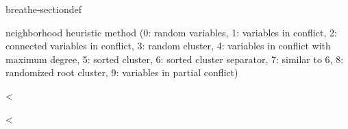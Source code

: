 \documentclass[letterpaper,10pt,openany,oneside,english]{sphinxmanual}
\begin{document}
\begin{fulllineitems}
\begin{sphinxuseclass}{breathe-sectiondef}
\begin{fulllineitems}
\sphinxAtStartPar
neighborhood heuristic method (0: random variables, 1: variables in conflict, 2: connected variables in conflict, 3: random cluster, 4: variables in conflict with maximum degree, 5: sorted cluster, 6: sorted cluster separator, 7: similar to 6, 8: randomized root cluster, 9: variables in partial conflict) 

\end{fulllineitems}


\begin{fulllineitems}
\label{\detokenize{ref/ref_cpp:_CPPv4N8ToulBar219vnsNeighborSizeSyncE}}\label{\detokenize{ref/ref_cpp:_CPPv3N8ToulBar219vnsNeighborSizeSyncE}}\label{\detokenize{ref/ref_cpp:_CPPv2N8ToulBar219vnsNeighborSizeSyncE}}\label{\detokenize{ref/ref_cpp:ToulBar2::vnsNeighborSizeSync__b}}
\pysigstartsignatures
\pysigstartmultiline
{}
\pysigstopmultiline
\pysigstopsignatures
\sphinxAtStartPar
\textless{} 

\end{fulllineitems}


\begin{fulllineitems}
\label{\detokenize{ref/ref_cpp:_CPPv4N8ToulBar216vnsParallelLimitE}}\label{\detokenize{ref/ref_cpp:_CPPv3N8ToulBar216vnsParallelLimitE}}\label{\detokenize{ref/ref_cpp:_CPPv2N8ToulBar216vnsParallelLimitE}}\label{\detokenize{ref/ref_cpp:ToulBar2::vnsParallelLimit__b}}
\pysigstartsignatures
\pysigstartmultiline
{}
\pysigstopmultiline
\pysigstopsignatures
\sphinxAtStartPar
\textless{} 

\end{fulllineitems}



\end{sphinxuseclass}
\end{fulllineitems}
\end{document}
